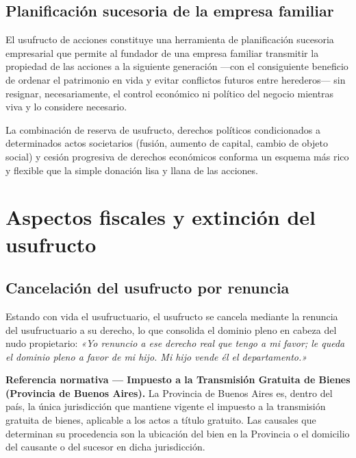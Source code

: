 \documentclass[12pt,oneside]{book}
\begin{document}
\section{Planificación sucesoria de la empresa familiar}

El usufructo de acciones constituye una herramienta de planificación sucesoria empresarial que permite al fundador de una empresa familiar transmitir la propiedad de las acciones a la siguiente generación ---con el consiguiente beneficio de ordenar el patrimonio en vida y evitar conflictos futuros entre herederos--- sin resignar, necesariamente, el control económico ni político del negocio mientras viva y lo considere necesario.

La combinación de reserva de usufructo, derechos políticos condicionados a determinados actos societarios (fusión, aumento de capital, cambio de objeto social) y cesión progresiva de derechos económicos conforma un esquema más rico y flexible que la simple donación lisa y llana de las acciones.

\chapter{Aspectos fiscales y extinción del usufructo}

\section{Cancelación del usufructo por renuncia}

Estando con vida el usufructuario, el usufructo se cancela mediante la renuncia del usufructuario a su derecho, lo que consolida el dominio pleno en cabeza del nudo propietario: \textit{«Yo renuncio a ese derecho real que tengo a mi favor; le queda el dominio pleno a favor de mi hijo. Mi hijo vende él el departamento.»}

\begin{important}
\textbf{Referencia normativa ---  Impuesto a la Transmisión Gratuita de Bienes (Provincia de Buenos Aires).} La Provincia de Buenos Aires es, dentro del país, la única jurisdicción que mantiene vigente el impuesto a la transmisión gratuita de bienes, aplicable a los actos a título gratuito. Las causales que determinan su procedencia son la ubicación del bien en la Provincia o el domicilio del causante o del sucesor en dicha jurisdicción.
\end{important}
\end{document}
